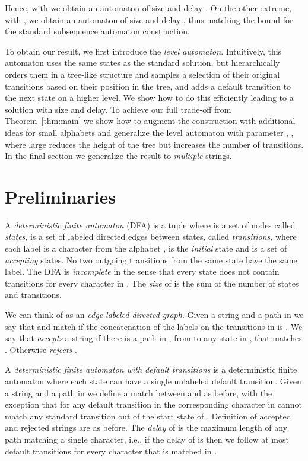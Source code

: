 \documentclass[a4paper,11pt]{article}
\begin{document}
Hence, with  we obtain an automaton of size  and delay . On the other extreme, with , we obtain an automaton of size  and delay , thus matching the bound for the standard subsequence automaton construction. 

To obtain our result, we first introduce the \emph{level automaton}. Intuitively, this automaton uses the same states as the standard solution, but hierarchically orders them in a tree-like structure and samples a selection of their original transitions based on their position in the tree, and adds a default transition to the next state on a higher level. We show how to do this efficiently leading to a solution with  size and  delay. To achieve our full trade-off from Theorem~\ref{thm:main} we show how to augment the construction with additional ideas for small alphabets and generalize the level automaton with parameter , , where large  reduces the height of the tree but increases the number of transitions. In the final section we generalize the result to \emph{multiple} strings.

\section{Preliminaries}
A \emph{deterministic finite automaton} (DFA) is a tuple  where  is a set of nodes called \emph{states},  is a set of labeled directed edges between states, called \emph{transitions}, where each label is a character from the alphabet ,  is the \emph{initial} state and  is a set of \emph{accepting} states. No two outgoing transitions from the same state have the same label. The DFA is \emph{incomplete} in the sense that every state does not contain transitions for every character in .
 The \emph{size} of  is the sum of the number of states and transitions.

We can think of  as an \emph{edge-labeled directed graph}.
Given a string  and a path  in  we say that  and  match if the concatenation of the labels on the transitions in  is . We say that  \emph{accepts} a string  if there is a path in , from  to any state in , that matches . Otherwise  \emph{rejects} .



A \emph{deterministic finite automaton with default transitions} is a deterministic finite automaton  where each state can have a single unlabeled default transition. Given a string  and a path  in  we define a match between  and  as before, with the exception that for any default transition  in  the corresponding character in  cannot match any standard transition out of the start state of . Definition of accepted and rejected strings are as before. The \emph{delay} of  is the maximum length of any path matching a single character, i.e., if the delay of  is  then we follow at most  default transitions for every character that is matched in .
\end{document}
